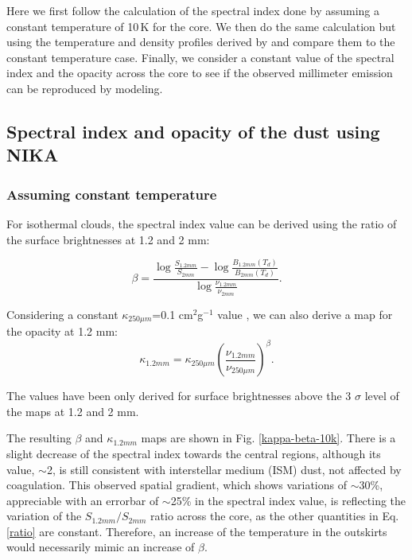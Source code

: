 \documentclass{aa}
\begin{document}
Here we first follow the calculation of the spectral index done by  assuming a constant temperature of 10\,K for the core. We then do the same calculation but using the temperature and density profiles derived by  and compare them to the constant temperature case. Finally, we consider a constant value of the spectral index and the opacity across the core to see if the observed millimeter emission can be reproduced by modeling. 

\subsection{Spectral index and opacity of the dust using NIKA}
\subsubsection{Assuming constant temperature}

For isothermal clouds, the spectral index value can be derived using the ratio of the surface brightnesses at 1.2 and 2 mm:

\begin{equation}
\beta = \frac{\log \frac{S_{1.2mm}}{S_{2mm}} - \log \frac{B_{1.2mm}(T_d)}{B_{2mm}(T_d)}}{\log \frac{\nu_{1.2mm}}{\nu_{2mm}}} .
\label{ratio}
\end{equation}

Considering a constant $\kappa _{250 \mu m}$=0.1 cm$^2$g$^{-1}$ value , we can also derive a map for the opacity at 1.2 mm:
\begin{equation}
\kappa_{1.2 mm} = \kappa_{250\mu m}\left( \frac{\nu_{1.2 mm}}{\nu_{250 \mu m}}\right)^{\beta} .
\end{equation}

The values have been only derived for surface brightnesses above the 3 $\sigma$ level of the maps at 1.2 and 2 mm. 

The resulting $\beta$ and $\kappa_{1.2mm}$ maps are shown in Fig. \ref{kappa-beta-10k}. There is a slight decrease of the spectral index towards the central regions, although its value, $\sim$2, is still consistent with interstellar medium (ISM) dust, not affected by coagulation.  This observed spatial gradient, which shows variations of $\sim$30\%, appreciable with an errorbar of $\sim$25\% in the spectral index value, is reflecting the variation of the $S_{1.2mm}/S_{2mm}$ ratio across the core, as the other quantities in Eq. \eqref{ratio} are constant. Therefore, an increase of the temperature in the outskirts would necessarily mimic an increase of $\beta$. 
\end{document}
